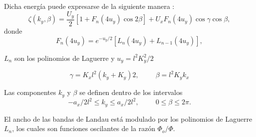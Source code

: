 \begin{frame}
	Dicha energía puede expresarse de la siguiente manera \cite{Wang2004}:
	\begin{equation}
			\zeta(k_{y}, \beta)=\frac{U_{y}}{2}\left[1+F_{n}(4u_{y})\cos 2\beta\right]+U_{x}F_{n}(4u_{y})\cos \gamma\cos \beta,
	\end{equation}
	donde
	\begin{equation}
		F_{n} (4u_{y}) = e^{- u_{y} / 2} \left[L_{n} (4u_{y}) + L_{n-1} (4u_{y}) \right],
	\end{equation}

	$L_n$ son los polinomios de Laguerre y $ u_{y} = l^{2} K_{y}^{2} / 2 $
\end{frame}

\begin{frame}
	\begin{equation}
		\gamma = K_{x} l^{2} (k_{y} + K_{y}) 2,\hspace{1cm} \beta = l^{2} K_{y} k_{x }
	\end{equation}

	Las componentes $ k_{y} $ y $ \beta $ se definen dentro de los intervalos
	\begin{equation}
	-a_{x} / 2l^{2} \leq k_{y} \leq a_{x} / 2l^{ 2},\hspace{1cm}0 \leq \beta \leq 2 \pi.                                                                               \end{equation}

  El ancho de las bandas de Landau está modulado por los polinomios de Laguerre $L_n$,
	los cuales son funciones oscilantes de la razón $\Phi_o/\Phi$.
\end{frame}
